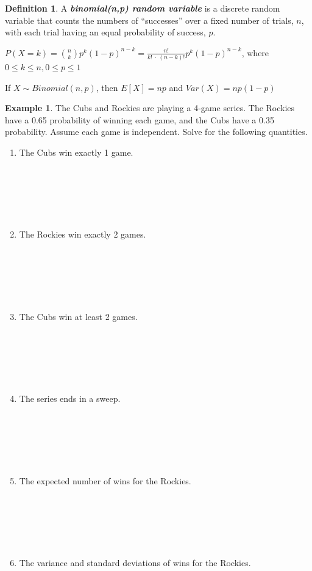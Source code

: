\documentclass[
  11pt,
]{book}
\theoremstyle{definition}
\newtheorem{definition}{Definition}[chapter]
\theoremstyle{definition}
\newtheorem{example}{Example}[chapter]
\theoremstyle{definition}
\theoremstyle{definition}
\theoremstyle{remark}
\begin{document}
\begin{definition}
A \textbf{\emph{binomial(n,p) random variable}} is a discrete random variable that counts the numbers of ``successes'' over a fixed number of trials, \(n\), with each trial having an equal probability of success, \(p\).

\(P(X=k) = \binom{n}{k} p^k(1-p)^{n-k} = \frac{n!}{k!\ \cdot\ (n-k)!} p^k(1-p)^{n-k}\), where \(0 \leq k \leq n, 0 \leq p \leq 1\)

If \(X \sim Binomial(n,p)\), then \(E[X]=np\) and \(Var(X)=np(1-p)\)
\end{definition}

\begin{example}
The Cubs and Rockies are playing a 4-game series. The Rockies have a 0.65 probability of winning each game, and the Cubs have a 0.35 probability. Assume each game is independent. Solve for the following quantities.
\end{example}

\begin{enumerate}
\def\labelenumi{(\alph{enumi})}
\item
  The Cubs win exactly 1 game.\\
  \strut \\
  \strut \\
  \strut \\
\item
  The Rockies win exactly 2 games.\\
  \strut \\
  \strut \\
  \strut \\
\item
  The Cubs win at least 2 games.\\
  \strut \\
  \strut \\
  \strut \\
\item
  The series ends in a sweep.\\
  \strut \\
  \strut \\
  \strut \\
\item
  The expected number of wins for the Rockies.\\
  \strut \\
  \strut \\
  \strut \\
\item
  The variance and standard deviations of wins for the Rockies.\\
  \strut \\
  \strut \\
  \strut \\
\end{enumerate}
\end{document}
